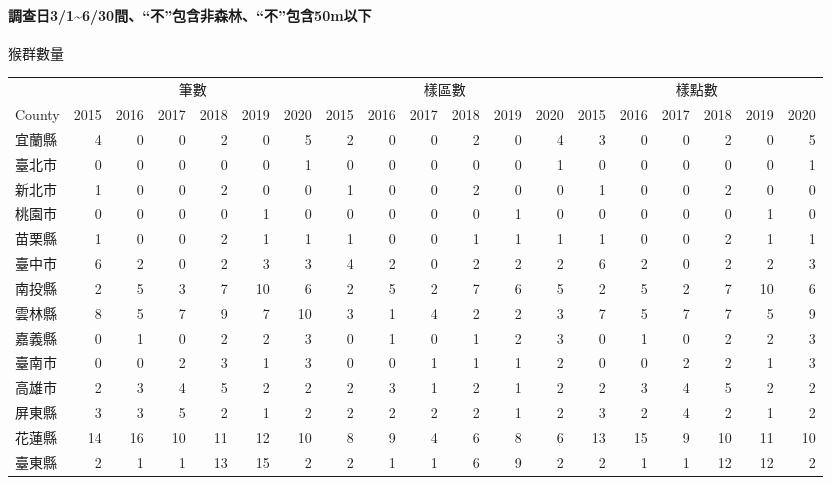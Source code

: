 \documentclass[
]{article}
\begin{document}
\hypertarget{ux8abfux67e5ux65e531630ux9593ux4e0dux5305ux542bux975eux68eeux6797ux4e0dux5305ux542b50mux4ee5ux4e0b}{%
\paragraph{\texorpdfstring{\textbf{調查日3/1\textasciitilde6/30間、``不''包含非森林、``不''包含50m以下}}{調查日3/1\textasciitilde6/30間、``不''包含非森林、``不''包含50m以下}}\label{ux8abfux67e5ux65e531630ux9593ux4e0dux5305ux542bux975eux68eeux6797ux4e0dux5305ux542b50mux4ee5ux4e0b}}

猴群數量

\begin{table}[H]
\centering
\begin{tabular}{l|r|r|r|r|r|r|r|r|r|r|r|r|r|r|r|r|r|r}
\hline
\multicolumn{1}{c|}{ } & \multicolumn{6}{c|}{筆數} & \multicolumn{6}{c|}{樣區數} & \multicolumn{6}{c}{樣點數} \\
\cline{2-7} \cline{8-13} \cline{14-19}
County &  2015 &  2016 &  2017 &  2018 &  2019 &  2020 &  2015 &  2016 &  2017 &  2018 &  2019 &  2020 &  2015 &  2016 &  2017 &  2018 &  2019 &  2020\\
\hline
宜蘭縣 & 4 & 0 & 0 & 2 & 0 & 5 & 2 & 0 & 0 & 2 & 0 & 4 & 3 & 0 & 0 & 2 & 0 & 5\\
\hline
臺北市 & 0 & 0 & 0 & 0 & 0 & 1 & 0 & 0 & 0 & 0 & 0 & 1 & 0 & 0 & 0 & 0 & 0 & 1\\
\hline
新北市 & 1 & 0 & 0 & 2 & 0 & 0 & 1 & 0 & 0 & 2 & 0 & 0 & 1 & 0 & 0 & 2 & 0 & 0\\
\hline
桃園市 & 0 & 0 & 0 & 0 & 1 & 0 & 0 & 0 & 0 & 0 & 1 & 0 & 0 & 0 & 0 & 0 & 1 & 0\\
\hline
苗栗縣 & 1 & 0 & 0 & 2 & 1 & 1 & 1 & 0 & 0 & 1 & 1 & 1 & 1 & 0 & 0 & 2 & 1 & 1\\
\hline
臺中市 & 6 & 2 & 0 & 2 & 3 & 3 & 4 & 2 & 0 & 2 & 2 & 2 & 6 & 2 & 0 & 2 & 2 & 3\\
\hline
南投縣 & 2 & 5 & 3 & 7 & 10 & 6 & 2 & 5 & 2 & 7 & 6 & 5 & 2 & 5 & 2 & 7 & 10 & 6\\
\hline
雲林縣 & 8 & 5 & 7 & 9 & 7 & 10 & 3 & 1 & 4 & 2 & 2 & 3 & 7 & 5 & 7 & 7 & 5 & 9\\
\hline
嘉義縣 & 0 & 1 & 0 & 2 & 2 & 3 & 0 & 1 & 0 & 1 & 2 & 3 & 0 & 1 & 0 & 2 & 2 & 3\\
\hline
臺南市 & 0 & 0 & 2 & 3 & 1 & 3 & 0 & 0 & 1 & 1 & 1 & 2 & 0 & 0 & 2 & 2 & 1 & 3\\
\hline
高雄市 & 2 & 3 & 4 & 5 & 2 & 2 & 2 & 3 & 1 & 2 & 1 & 2 & 2 & 3 & 4 & 5 & 2 & 2\\
\hline
屏東縣 & 3 & 3 & 5 & 2 & 1 & 2 & 2 & 2 & 2 & 2 & 1 & 2 & 3 & 2 & 4 & 2 & 1 & 2\\
\hline
花蓮縣 & 14 & 16 & 10 & 11 & 12 & 10 & 8 & 9 & 4 & 6 & 8 & 6 & 13 & 15 & 9 & 10 & 11 & 10\\
\hline
臺東縣 & 2 & 1 & 1 & 13 & 15 & 2 & 2 & 1 & 1 & 6 & 9 & 2 & 2 & 1 & 1 & 12 & 12 & 2\\
\hline
\end{tabular}
\end{table}
\end{document}
